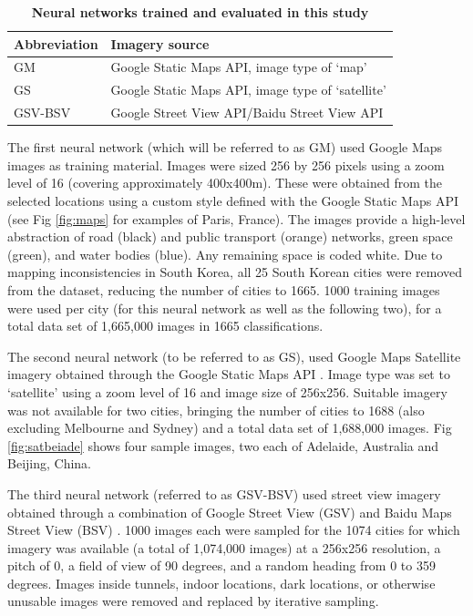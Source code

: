 \documentclass[10pt,letterpaper,hidelinks]{article}
\begin{document}
\begin{table}[!htbp]
\caption{\bf Neural networks trained and evaluated in this study \label{tab:neuralnetworks}}     
\begin{tabular}{ l l }
 \hline Abbreviation   &  Imagery source \\ \hline
GM & Google Static Maps API, image type of `map'     \\ 
GS & Google Static Maps API, image type of `satellite'      \\
GSV-BSV & Google Street View API/Baidu Street View API     \\ \hline

\end{tabular}
\end{table}

The first neural network (which will be referred to as GM) used Google Maps images as training material. Images were sized 256 by 256 pixels using a zoom level of 16 (covering approximately 400x400m). These were obtained from the selected locations using a custom style defined with the Google Static Maps API \cite{GoogleStatic2017} (see Fig \ref{fig:maps} for examples of Paris, France). The images provide a high-level abstraction of road (black) and public transport (orange) networks, green space (green), and water bodies (blue). Any remaining space is coded white. Due to mapping inconsistencies in South Korea, all 25 South Korean cities were removed from the dataset, reducing the number of cities to 1665. 1000 training images were used per city (for this neural network as well as the following two), for a total data set of 1,665,000 images in 1665 classifications. 

The second neural network (to be referred to as GS), used Google Maps Satellite imagery obtained through the Google Static Maps API \cite{GoogleStatic2017}. Image type was set to `satellite' using a zoom level of 16 and image size of 256x256. Suitable imagery was not available for two cities, bringing the number of cities to 1688 (also excluding Melbourne and Sydney) and a total data set of 1,688,000 images. Fig \ref{fig:satbeiade} shows four sample images, two each of Adelaide, Australia and Beijing, China. 

The third neural network (referred to as GSV-BSV) used street view imagery obtained through a combination of Google Street View (GSV) \cite{GoogleMaps2017b} and Baidu Maps Street View (BSV) \cite{Baidu2017}. 1000 images each were sampled for the 1074 cities for which imagery was available (a total of 1,074,000 images) at a 256x256 resolution, a pitch of 0, a field of view of 90 degrees, and a random heading from 0 to 359 degrees. Images inside tunnels, indoor locations, dark locations, or otherwise unusable images were removed and replaced by iterative sampling.
\end{document}
